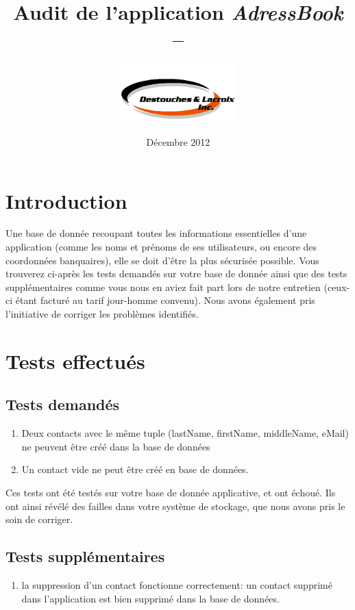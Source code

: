 \documentclass{article}
\title{Audit de l'application \textit{AdressBook} \\ --}
\author{   \includegraphics{UberLogo}}
\date{Décembre 2012}
\begin{document}
\begin{titlepage}
\pagestyle{fancy}

  	\maketitle
  	\tableofcontents
\end{titlepage}

\newpage
\section{Introduction}

Une base de donnée recoupant toutes les informations essentielles d'une application (comme les noms et prénoms de ses utilisateurs, ou encore des coordonnées banquaires), elle se doit d'être la plus sécurisée possible. Vous trouverez ci-après les tests demandés sur votre base de donnée ainsi que des tests supplémentaires comme vous nous en aviez fait part lors de notre entretien (ceux-ci étant facturé au tarif jour-homme convenu). Nous avons également pris l'initiative de corriger les problèmes identifiés.

\section{Tests effectués}

\subsection{Tests demandés}
\begin{enumerate}
\item Deux contacts avec le même tuple (lastName, firstName, middleName, eMail) ne peuvent être créé dans la base de données
\item Un contact vide ne peut être créé en base de données.
\end{enumerate}

Ces tests ont été testés sur votre base de donnée applicative, et ont échoué. Ils ont ainsi révélé des failles dans votre système de stockage, que nous avons pris le soin de corriger.

\subsection{Tests supplémentaires}
\begin{enumerate}
\item la suppression d'un contact fonctionne correctement: un contact supprimé dans l'application est bien supprimé dans la base de données.
\end{enumerate}
\end{document}
